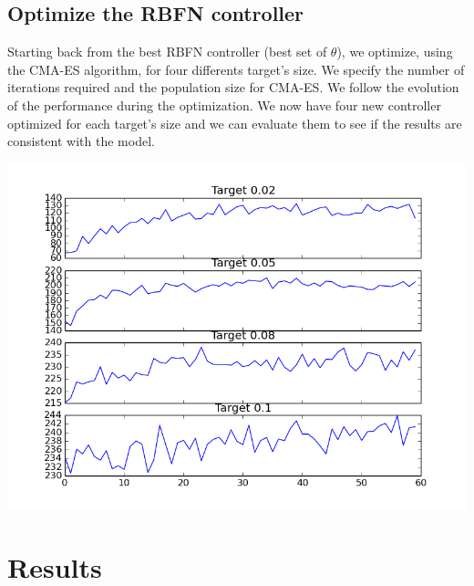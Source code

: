 \documentclass[pdftex,a4paper,11pt]{report}
\begin{document}
\subsection{Optimize the RBFN controller}
Starting back from the best RBFN controller (best set of $\theta$), we optimize, using the CMA-ES algorithm, for four differents target's size.
We specify the number of iterations required and the population size for CMA-ES. We follow the evolution of the performance during the optimization.
We now have four new controller optimized for each target's size and we can evaluate them to see if the results are consistent with the model.
\begin{center}
\includegraphics[scale=0.5]{figures/cmaesProgression6000.png}
\end{center}

\section{Results}
\end{document}
